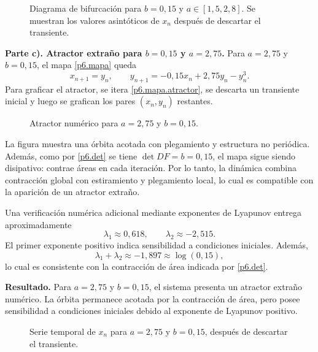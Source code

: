 \documentclass[12pt]{article}
\newcommand{\resultado}{\textbf{Resultado.}\enspace}
\begin{document}
\begin{figure}[htbp]
    \centering
    
    \caption{Diagrama de bifurcación para $b=0{,}15$ y $a\in[1{,}5,2{,}8]$. Se muestran los valores asintóticos de $x_n$ después de descartar el transiente.}
\end{figure}

\textbf{Parte c). Atractor extraño para $b=0{,}15$ y $a=2{,}75$.}
Para $a=2{,}75$ y $b=0{,}15$, el mapa \eqref{p6.mapa} queda
\begin{equation}\label{p6.mapa.atractor}
    x_{n+1}=y_n,
    \qquad
    y_{n+1}=-0{,}15x_n+2{,}75y_n-y_n^3.
\end{equation}
Para graficar el atractor, se itera \eqref{p6.mapa.atractor}, se descarta un transiente inicial y luego se grafican los pares $(x_n,y_n)$ restantes.

\begin{figure}[htbp]
    \centering
    
    \caption{Atractor numérico para $a=2{,}75$ y $b=0{,}15$.}
\end{figure}

La figura muestra una órbita acotada con plegamiento y estructura no periódica. Además, como por \eqref{p6.det} se tiene $\det DF=b=0{,}15$, el mapa sigue siendo disipativo: contrae áreas en cada iteración. Por lo tanto, la dinámica combina contracción global con estiramiento y plegamiento local, lo cual es compatible con la aparición de un atractor extraño.

Una verificación numérica adicional mediante exponentes de Lyapunov entrega aproximadamente
\begin{equation*}
    \lambda_1\approx 0{,}618,
    \qquad
    \lambda_2\approx -2{,}515.
\end{equation*}
El primer exponente positivo indica sensibilidad a condiciones iniciales. Además,
\begin{equation*}
    \lambda_1+
    \lambda_2\approx -1{,}897\approx \log(0{,}15),
\end{equation*}
lo cual es consistente con la contracción de área indicada por \eqref{p6.det}.

\resultado
Para $a=2{,}75$ y $b=0{,}15$, el sistema presenta un atractor extraño numérico. La órbita permanece acotada por la contracción de área, pero posee sensibilidad a condiciones iniciales debido al exponente de Lyapunov positivo.

\begin{figure}[htbp]
    \centering
    
    \caption{Serie temporal de $x_n$ para $a=2{,}75$ y $b=0{,}15$, después de descartar el transiente.}
\end{figure}

\end{document}

